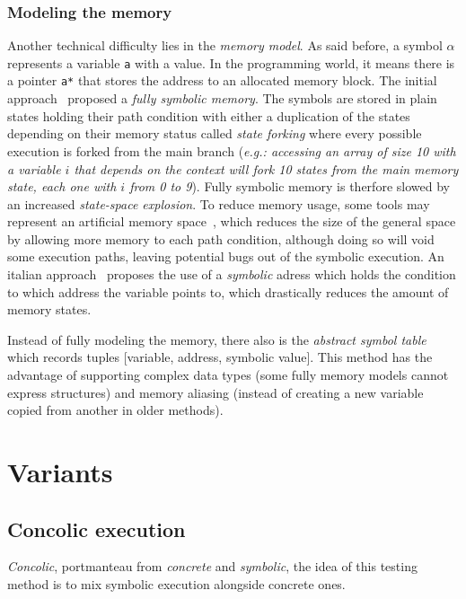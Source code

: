 \documentclass[11pt]{IEEEtran}
\begin{document}
      \subsubsection{Modeling the memory}
        Another technical difficulty lies in the \emph{memory model}. As said before, a symbol $\alpha$ represents a variable \texttt{a} with a value. In the programming world, it means there is a pointer \texttt{a*} that stores the address to an allocated memory block. The initial approach~\cite{newapproach} proposed a \emph{fully symbolic memory}. The symbols are stored in plain states holding their path condition with either a duplication of the states depending on their memory status called \emph{state forking} where every possible execution is forked from the main branch (\emph{e.g.: accessing an array of size 10 with a variable $i$ that depends on the context will fork 10 states from the main memory state, each one with $i$ from 0 to 9}). Fully symbolic memory is therfore slowed by an increased \emph{state-space explosion}. To reduce memory usage, some tools may represent an artificial memory space~\cite{5635129}, which reduces the size of the general space by allowing more memory to each path condition, although doing so will void some execution paths, leaving potential bugs out of the symbolic execution. An italian approach~\cite{memorymodelpointers} proposes the use of a \emph{symbolic} adress which holds the condition to which address the variable points to, which drastically reduces the amount of memory states.

        Instead of fully modeling the memory, there also is the \emph{abstract symbol table}~\cite{memorytablemodel} which records tuples [variable, address, symbolic value]. This method has the advantage of supporting complex data types (some fully memory models cannot express structures) and memory aliasing (instead of creating a new variable copied from another in older methods).
  \section{Variants}
    \subsection{Concolic execution}
    \label{subsec:concolicExecution}
    	\emph{Concolic}, portmanteau from \emph{concrete} and \emph{symbolic}, the idea of this testing method is to mix symbolic execution alongside concrete ones.\\
\end{document}

